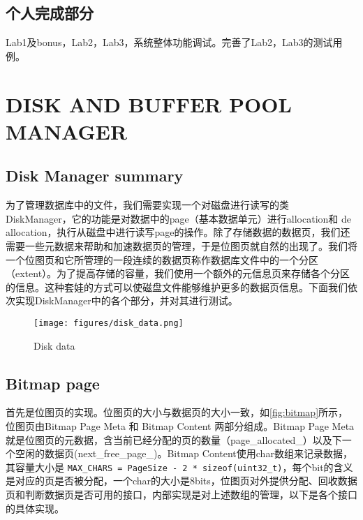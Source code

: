 \documentclass[12pt,hyperref,a4paper,UTF8]{ctexart}
\begin{document}
\cover

\thispagestyle{empty} %

\newpage
\tableofcontents

\newpage


\subsection*{个人完成部分}
Lab1及bonus，Lab2，Lab3，系统整体功能调试。完善了Lab2，Lab3的测试用例。

\section{DISK AND BUFFER POOL MANAGER}

\subsection{Disk Manager summary}

为了管理数据库中的文件，我们需要实现一个对磁盘进行读写的类 DiskManager，它的功能是对数据中的page（基本数据单元）进行allocation和 de allocation，执行从磁盘中进行读写page的操作。除了存储数据的数据页，我们还需要一些元数据来帮助和加速数据页的管理，于是位图页就自然的出现了。我们将一个位图页和它所管理的一段连续的数据页称作数据库文件中的一个分区（extent）。为了提高存储的容量，我们使用一个额外的元信息页来存储各个分区的信息。这种套娃的方式可以使磁盘文件能够维护更多的数据页信息。下面我们依次实现DiskManager中的各个部分，并对其进行测试。

\begin{figure}[h]
    \centering
    \texttt{[image: figures/disk\_data.png]}
    \caption{Disk data}
    \label{fig:enter-label}
\end{figure}

\subsection{Bitmap page}

首先是位图页的实现。位图页的大小与数据页的大小一致，如\ref{fig:bitmap}所示，位图页由Bitmap Page Meta 和 Bitmap Content 两部分组成。Bitmap Page Meta就是位图页的元数据，含当前已经分配的页的数量（page\_allocated\_）以及下一个空闲的数据页(next\_free\_page\_)。Bitmap Content使用char数组来记录数据，其容量大小是 \verb|MAX_CHARS = PageSize - 2 * sizeof(uint32_t)|，每个bit的含义是对应的页是否被分配，一个char的大小是8bits，位图页对外提供分配、回收数据页和判断数据页是否可用的接口，内部实现是对上述数组的管理，以下是各个接口的具体实现。
\end{document}
